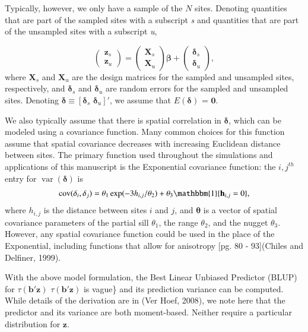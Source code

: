 \documentclass[]{elsarticle} %
\begin{document}
Typically, however, we only have a sample of the \(N\) sites. Denoting
quantities that are part of the sampled sites with a subscript \emph{s}
and quantities that are part of the unsampled sites with a subscript
\emph{u},

\begin{equation}
\begin{pmatrix} \label{equation:Zmarginal}
    \mathbf{z}_s      \\
    \mathbf{z}_u
\end{pmatrix}
=
\begin{pmatrix}
  \mathbf{X}_s    \\
  \mathbf{X}_u
\end{pmatrix}
\bm{\beta} +
\begin{pmatrix}
\bm{\delta}_s    \\
\bm{\delta}_u
\end{pmatrix},
\end{equation} where \(\mathbf{X}_s\) and \(\mathbf{X}_u\) are the
design matrices for the sampled and unsampled sites, respectively, and
\(\bm{\delta}_s\) and \(\bm{\delta}_u\) are random errors for the
sampled and unsampled sites. Denoting
\(\bm{\delta} \equiv [\bm{\delta}_s \,\, \bm{\delta}_u]'\), we assume
that \(E(\bm{\delta})\) = \(\mathbf{0}\).

We also typically assume that there is spatial correlation in
\(\bm{\delta}\), which can be modeled using a covariance function. Many
common choices for this function assume that spatial covariance
decreases with increasing Euclidean distance between sites. The primary
function used throughout the simulations and applications of this
manuscript is the Exponential covariance function: the \(i,j^{th}\)
entry for \(\mathop{\mathrm{{var}}}(\bm{\delta})\) is \mbox{}
\begin{align}\label{equation:expcov}
\mathop{\mathrm{{cov}}}(\delta_i, \delta_j) = \theta_1\exp(-3h_{i,j}/\theta_2) + \theta_3\mathbbm{1}\{\mathbf{h}_{i,j} = 0\}, 
\end{align} where \(h_{i,j}\) is the distance between sites \(i\) and
\(j\), and \(\bm{\theta}\) is a vector of spatial covariance parameters
of the partial sill \(\theta_1\), the range \(\theta_2\), and the nugget
\(\theta_3\). However, any spatial covariance function could be used in
the place of the Exponential, including functions that allow for
anisotropy {[}pg. 80 - 93{]}(Chiles and Delfiner, 1999).

With the above model formulation, the Best Linear Unbiased Predictor
(BLUP) for \(\tau(\mathbf{b}'\mathbf{z})\)
\(\tau(\mathbf{b}'\mathbf{z})\) is vague\} and its prediction variance
can be computed. While details of the derivation are in (Ver Hoef,
2008), we note here that the predictor and its variance are both
moment-based. Neither require a particular distribution for
\(\mathbf{z}\).
\end{document}
